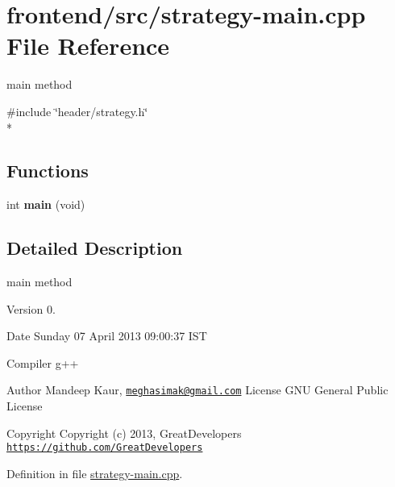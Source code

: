 \hypertarget{strategy-main_8cpp}{\section{frontend/src/strategy-\/main.cpp File Reference}
\label{strategy-main_8cpp}
}


main method  


{\ttfamily \#include \char`\"{}header/strategy.\-h\char`\"{}}\\*
\subsection*{Functions}
\begin{DoxyCompactItemize}
\item 
\hypertarget{strategy-main_8cpp_a840291bc02cba5474a4cb46a9b9566fe}{int {\bfseries main} (void)}\label{strategy-main_8cpp_a840291bc02cba5474a4cb46a9b9566fe}

\end{DoxyCompactItemize}


\subsection{Detailed Description}
main method \begin{DoxyVersion}{Version}
0. 
\end{DoxyVersion}
\begin{DoxyDate}{Date}
Sunday 07 April 2013 09\-:00\-:37 I\-S\-T\par
Compiler g++
\end{DoxyDate}
\begin{DoxyAuthor}{Author}
Mandeep Kaur, \href{mailto:meghasimak@gmail.com}{\tt meghasimak@gmail.\-com} License G\-N\-U General Public License 
\end{DoxyAuthor}
\begin{DoxyCopyright}{Copyright}
Copyright (c) 2013, Great\-Developers \href{https://github.com/GreatDevelopers}{\tt https\-://github.\-com/\-Great\-Developers} 
\end{DoxyCopyright}


Definition in file \hyperlink{strategy-main_8cpp_source}{strategy-\/main.\-cpp}.

